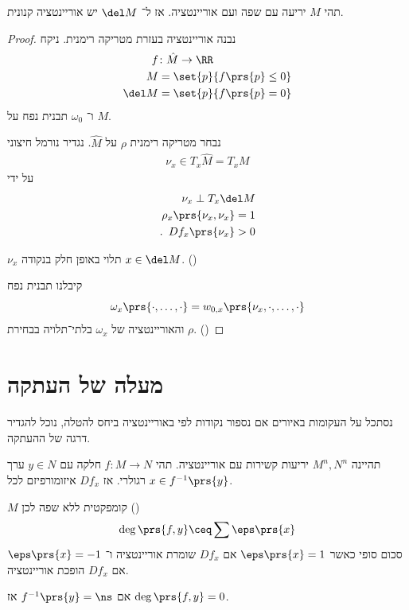 \documentclass[a4paper,10pt,twoside,openany]{book}
\begin{document}
\begin{theorem}
תהי
$M$
יריעה עם שפה ועם אוריינטציה.
אז ל־%
$\del M$
יש אוריינטציה קנונית.
\end{theorem}
\begin{proof}
נבנה אוריינטציה בעזרת מטריקה רימנית. ניקח
\begin{align*}
f &\colon \hat{M} \to \RR \\
M &= \set{p}{f\prs{p} \leq 0} \\
\del M &= \set{p}{f\prs{p} = 0}
\end{align*}
ו־%
$\omega_0$
תבנית נפח על
$M$.

נבחר מטריקה רימנית
$\rho$
על
$\hat{M}$.
נגדיר נורמל חיצוני
\begin{align*}
\nu_x \in T_x\hat{M} = T_x M
\end{align*}
על ידי
\begin{align*}
\nu_x \perp T_x \del M \\
\rho_x\prs{\nu_x, \nu_x} = 1 \\
\text{.} \phantom{\rho} D f_x\prs{\nu_x} > 0
\end{align*}

$\nu_x$
תלוי באופן חלק בנקודה
$x \in \del M$. ()

קיבלנו תבנית נפח
\[\omega_x \prs{\cdot, \ldots, \cdot} = w_{0,x}\prs{\nu_x, \cdot, \ldots, \cdot}\]
והאוריינטציה של
$\omega_x$
בלתי־תלויה בבחירת
$\rho$. ()
\end{proof}

\section{מעלה של העתקה}

נסתכל על העקומות באיורים
אם נספור נקודות לפי באוריינטציה ביחס להטלה, נוכל להגדיר דרגה של ההעתקה.

\begin{definition}
תהיינה
$M^n, N^n$
יריעות קשירות עם אוריינטציה.
תהי
$f \colon M \to N$
חלקה עם
$y \in N$
ערך רגולרי.
אז
$D f_x$
איזומורפיזם לכל
$x \in f^{-1}\prs{y}$.

$M$
קומפקטית ללא שפה לכן ()
\[\deg \prs{f,y} \ceq \sum \eps \prs{x}\]
סכום סופי כאשר
$\eps \prs{x} = 1$
אם
$D f_x$
שומרת אוריינטציה ו־%
$\eps \prs{x} = -1$
אם
$D f_x$
הופכת אוריינטציה.
\end{definition}

\begin{remark}
אם
$f^{-1}\prs{y} = \ns$
אז
$\deg\prs{f,y} = 0$.
\end{remark}
\end{document}
